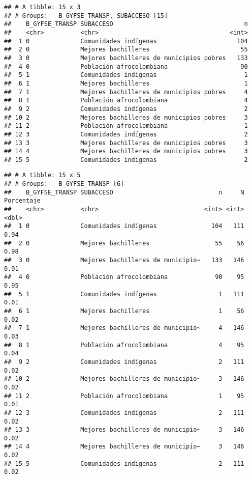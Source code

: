\documentclass[]{article}
\theoremstyle{definition}
\theoremstyle{definition}
\theoremstyle{definition}
\theoremstyle{remark}
\begin{document}
\begin{verbatim}
## # A tibble: 15 x 3
## # Groups:   B_GYFSE_TRANSP, SUBACCESO [15]
##    B_GYFSE_TRANSP SUBACCESO                                    n
##    <chr>          <chr>                                    <int>
##  1 0              Comunidades indígenas                      104
##  2 0              Mejores bachilleres                         55
##  3 0              Mejores bachilleres de municipios pobres   133
##  4 0              Población afrocolombiana                    90
##  5 1              Comunidades indígenas                        1
##  6 1              Mejores bachilleres                          1
##  7 1              Mejores bachilleres de municipios pobres     4
##  8 1              Población afrocolombiana                     4
##  9 2              Comunidades indígenas                        2
## 10 2              Mejores bachilleres de municipios pobres     3
## 11 2              Población afrocolombiana                     1
## 12 3              Comunidades indígenas                        2
## 13 3              Mejores bachilleres de municipios pobres     3
## 14 4              Mejores bachilleres de municipios pobres     3
## 15 5              Comunidades indígenas                        2
\end{verbatim}

\begin{verbatim}
## # A tibble: 15 x 5
## # Groups:   B_GYFSE_TRANSP [6]
##    B_GYFSE_TRANSP SUBACCESO                             n     N Porcentaje
##    <chr>          <chr>                             <int> <int>      <dbl>
##  1 0              Comunidades indígenas               104   111       0.94
##  2 0              Mejores bachilleres                  55    56       0.98
##  3 0              Mejores bachilleres de municipio~   133   146       0.91
##  4 0              Población afrocolombiana             90    95       0.95
##  5 1              Comunidades indígenas                 1   111       0.01
##  6 1              Mejores bachilleres                   1    56       0.02
##  7 1              Mejores bachilleres de municipio~     4   146       0.03
##  8 1              Población afrocolombiana              4    95       0.04
##  9 2              Comunidades indígenas                 2   111       0.02
## 10 2              Mejores bachilleres de municipio~     3   146       0.02
## 11 2              Población afrocolombiana              1    95       0.01
## 12 3              Comunidades indígenas                 2   111       0.02
## 13 3              Mejores bachilleres de municipio~     3   146       0.02
## 14 4              Mejores bachilleres de municipio~     3   146       0.02
## 15 5              Comunidades indígenas                 2   111       0.02
\end{verbatim}
\end{document}
